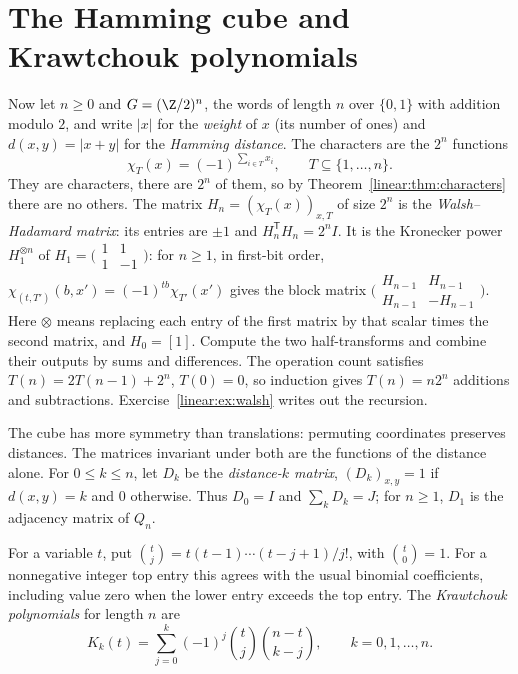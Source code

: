 \section{The Hamming cube and Krawtchouk polynomials}

Now let $n\ge0$ and $G=(\Z/2)^n$, the words of length $n$ over $\{0,1\}$ with addition modulo $2$, and write $|x|$ for the \emph{weight} of $x$
(its number of ones) and $d(x,y)=|x+y|$ for the \emph{Hamming distance}. The characters are the $2^n$ functions
\[
\chi_T(x)=(-1)^{\sum_{i\in T}x_i},\qquad T\subseteq\{1,\dots,n\}.
\]
They are characters, there are $2^n$ of them, so by Theorem~\ref{linear:thm:characters} there are no others. The matrix $H_n=(\chi_T(x))
_{x,T}$ of size $2^n$ is the \emph{Walsh--Hadamard matrix}: its entries are $\pm1$ and $H_n^{\mathsf T}H_n=2^nI$. It is the
Kronecker power $H_1^{\otimes n}$ of $H_1=\bigl(\begin{smallmatrix}1&1\\1&-1\end{smallmatrix}\bigr)$:
for $n\ge1$, in first-bit order, $\chi_{(t,T')}(b,x')=(-1)^{tb}\chi_{T'}(x')$ gives the
block matrix $\bigl(\begin{smallmatrix}H_{n-1}&H_{n-1}\\H_{n-1}&-H_{n-1}\end{smallmatrix}\bigr)$.
Here $\otimes$ means replacing each entry of the first matrix by that scalar
times the second matrix, and $H_0=[1]$. Compute the two half-transforms and
combine their outputs by sums and differences. The operation count satisfies
$T(n)=2T(n-1)+2^n$, $T(0)=0$, so induction gives $T(n)=n2^n$ additions
and subtractions. Exercise~\ref{linear:ex:walsh} writes out the recursion.

The cube has more symmetry than translations: permuting coordinates preserves distances. The matrices invariant under both are
the functions of the distance alone. For $0\le k\le n$, let $D_k$ be the \emph{distance-$k$ matrix}, $(D_k)_{x,y}=1$ if $d(x,y)=k$
and $0$ otherwise. Thus $D_0=I$ and $\sum_kD_k=J$; for $n\ge1$, $D_1$ is the adjacency matrix of $Q_n$.

\begin{definition}\label{linear:def:krawtchouk}
For a variable $t$, put $\binom tj=t(t-1)\cdots(t-j+1)/j!$, with
$\binom t0=1$. For a nonnegative integer top entry this agrees with the
usual binomial coefficients, including value zero when the lower entry
exceeds the top entry.
The \emph{Krawtchouk polynomials} for length $n$ are
\[
K_k(t)=\sum_{j=0}^k(-1)^j\binom tj\binom{n-t}{k-j},\qquad k=0,1,\dots,n.
\]
\end{definition}

